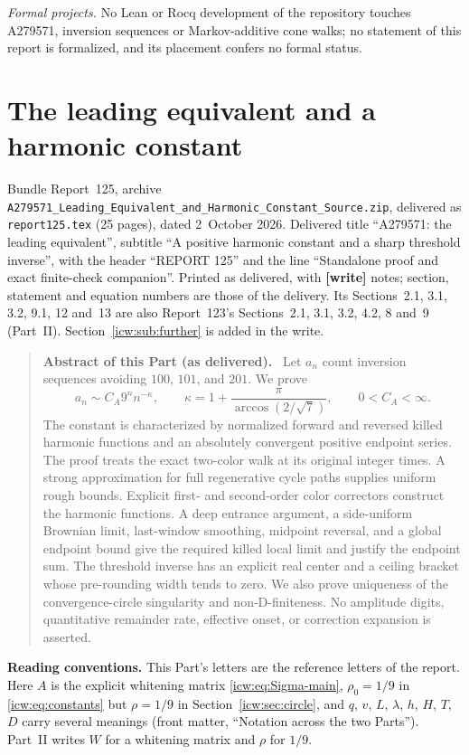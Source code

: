 \documentclass[11pt,letterpaper]{article}
\theoremstyle{remark}\newtheorem{remark}[theorem]{Remark}
\newcommand{\1}{\mathbf1}
\newenvironment{partabstract}{\begin{quote}\small\noindent\textbf{Abstract of this Part (as delivered).}\ }{\end{quote}}
\newcommand{\partsource}[1]{\par\noindent\begin{minipage}{\textwidth}\small #1\end{minipage}\par\medskip}
\newcommand{\file}[1]{\textup{\nolinkurl{#1}}}
\begin{document}
\emph{Formal projects.} No Lean or Rocq development of the repository touches A279571, inversion sequences or Markov-additive cone walks; no statement of this report is formalized, and its placement confers no formal status.

\clearpage
\part{The leading equivalent and a harmonic constant}\label{icw:part}
\partsource{Bundle Report~125, archive \file{A279571_Leading_Equivalent_and_Harmonic_Constant_Source.zip}, delivered as \file{report125.tex} (25 pages), dated 2~October 2026. Delivered title ``A279571: the leading equivalent'', subtitle ``A positive harmonic constant and a sharp threshold inverse'', with the header ``REPORT 125'' and the line ``Standalone proof and exact finite-check companion''. Printed as delivered, with \textbf{[write]} notes; section, statement and equation numbers are those of the delivery. Its Sections~2.1, 3.1, 3.2, 9.1, 12 and~13 are also Report~123's Sections~2.1, 3.1, 3.2, 4.2, 8 and~9 (Part~II). Section~\ref{icw:sub:further} is added in the write.}
\begin{partabstract}
Let $a_n$ count inversion sequences avoiding $100$, $101$, and $201$.
We prove
\[
 a_n\sim C_A9^n n^{-\kappa},\qquad
 \kappa=1+\frac{\pi}{\arccos(2/\sqrt7)},\qquad 0<C_A<\infty.
\]
The constant is characterized by normalized forward and reversed killed
harmonic functions and an absolutely convergent positive endpoint series.
The proof treats the exact two-color walk at its original integer times.
A strong approximation for full regenerative cycle paths supplies uniform
rough bounds. Explicit first- and second-order color correctors construct
the harmonic functions. A deep entrance argument, a side-uniform Brownian
limit, last-window smoothing, midpoint reversal, and a global endpoint
bound give the required killed local limit and justify the endpoint sum.
The threshold inverse has an explicit real center and a ceiling bracket
whose pre-rounding width tends to zero. We also prove uniqueness of the
convergence-circle singularity and non-D-finiteness. No amplitude digits,
quantitative remainder rate, effective onset, or correction expansion is
asserted.
\end{partabstract}
\noindent\textbf{Reading conventions.} This Part's letters are the reference letters of the report. Here $A$ is the explicit whitening matrix \eqref{icw:eq:Sigma-main}, $\rho_0=1/9$ in \eqref{icw:eq:constants} but $\rho=1/9$ in Section~\ref{icw:sec:circle}, and $q$, $v$, $L$, $\lambda$, $h$, $H$, $T$, $D$ carry several meanings (front matter, ``Notation across the two Parts''). Part~II writes $W$ for a whitening matrix and $\rho$ for $1/9$.
\end{document}
